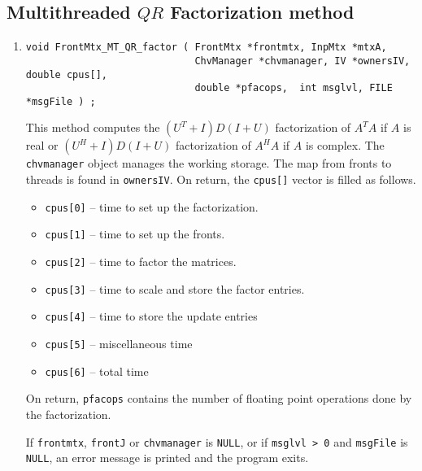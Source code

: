 \subsection{Multithreaded $QR$ Factorization method}
\label{subsection:FrontMtx:proto:factorQR_MT}
\par
\begin{enumerate}
\item
\begin{verbatim}
void FrontMtx_MT_QR_factor ( FrontMtx *frontmtx, InpMtx *mtxA,
                             ChvManager *chvmanager, IV *ownersIV, double cpus[],
                             double *pfacops,  int msglvl, FILE *msgFile ) ;
\end{verbatim}
This method computes the
$(U^T+I)D(I+U)$ factorization of $A^TA$ if $A$ is real
or
$(U^H+I)D(I+U)$ factorization of $A^HA$ if $A$ is complex.
The {\tt chvmanager} object manages the working storage.
The map from fronts to threads is found in {\tt ownersIV}.
On return, the {\tt cpus[]} vector is filled as follows.
\begin{itemize}
\item
{\tt cpus[0]} -- time to set up the factorization.
\item
{\tt cpus[1]} -- time to set up the fronts.
\item
{\tt cpus[2]} -- time to factor the matrices.
\item
{\tt cpus[3]} -- time to scale and store the factor entries.
\item
{\tt cpus[4]} -- time to store the update entries
\item
{\tt cpus[5]} -- miscellaneous time
\item
{\tt cpus[6]} -- total time
\end{itemize}
On return, {\tt *pfacops} contains the number of floating point
operations done by the factorization.
\par {}
If {\tt frontmtx}, {\tt frontJ} or {\tt chvmanager} is {\tt NULL},
or if {\tt msglvl > 0} and {\tt msgFile} is {\tt NULL},
an error message is printed and the program exits.
\end{enumerate}
\par
